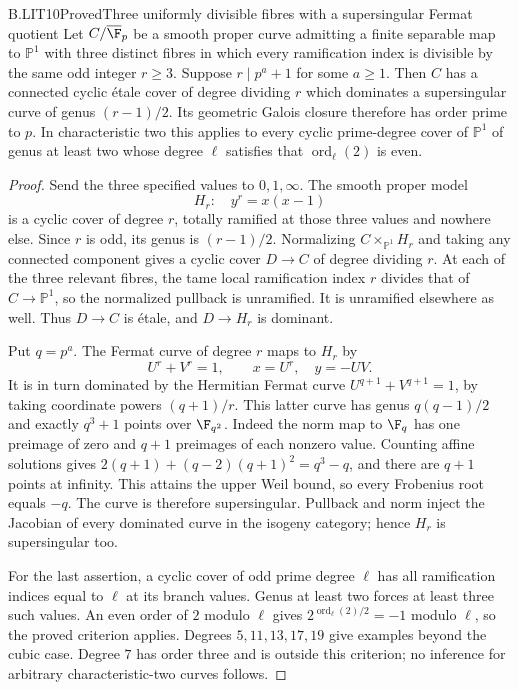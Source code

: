 \begin{claim}{B.LIT10}{Proved}{Three uniformly divisible fibres with a supersingular Fermat quotient}
Let $C/\overline{\F}_p$ be a smooth proper curve admitting
a finite separable map to $\mathbb P^1$ with three
distinct fibres in which every ramification index is
divisible by the same odd integer $r\ge3$.
Suppose $r\mid p^a+1$ for some $a\ge1$.
Then $C$ has a connected cyclic \'etale cover of degree
dividing $r$ which dominates a supersingular curve of
genus $(r-1)/2$. Its geometric Galois closure therefore
has order prime to $p$.
In characteristic two this applies to every cyclic
prime-degree cover of $\mathbb P^1$ of genus at least
two whose degree $\ell$ satisfies that
$\operatorname{ord}_\ell(2)$ is even.
\end{claim}

\begin{proof}
Send the three specified values to $0,1,\infty$.
The smooth proper model
\[
 H_r:\quad y^r=x(x-1)
\]
is a cyclic cover of degree $r$, totally ramified
at those three values and nowhere else. Since $r$
is odd, its genus is $(r-1)/2$. Normalizing
$C\times_{\mathbb P^1}H_r$ and taking any connected
component gives a cyclic cover $D\to C$ of degree
dividing $r$. At each of the three relevant fibres,
the tame local ramification index $r$ divides that
of $C\to\mathbb P^1$, so the normalized pullback is
unramified. It is unramified elsewhere as well.
Thus $D\to C$ is \'etale, and $D\to H_r$ is dominant.

Put $q=p^a$. The Fermat curve of degree $r$ maps
to $H_r$ by
\[
 U^r+V^r=1,\qquad x=U^r,\quad y=-UV.
\]
It is in turn dominated by the Hermitian Fermat
curve $U^{q+1}+V^{q+1}=1$, by taking coordinate
powers $(q+1)/r$. This latter curve has genus
$q(q-1)/2$ and exactly $q^3+1$ points over
$\F_{q^2}$. Indeed the norm map to $\F_q$ has
one preimage of zero and $q+1$ preimages of each
nonzero value. Counting affine solutions gives
$2(q+1)+(q-2)(q+1)^2=q^3-q$, and there are
$q+1$ points at infinity. This attains the upper
Weil bound, so every Frobenius root equals $-q$.
The curve is therefore supersingular. Pullback
and norm inject the Jacobian of every dominated
curve in the isogeny category; hence $H_r$ is
supersingular too.

For the last assertion, a cyclic cover of odd prime
degree $\ell$ has all ramification indices equal
to $\ell$ at its branch values. Genus at least two
forces at least three such values. An even order
of $2$ modulo $\ell$ gives
$2^{\operatorname{ord}_\ell(2)/2}=-1$ modulo
$\ell$, so the proved criterion applies. Degrees
$5,11,13,17,19$ give examples beyond the cubic
case. Degree $7$ has order three and is outside
this criterion; no inference for arbitrary
characteristic-two curves follows.
\end{proof}
